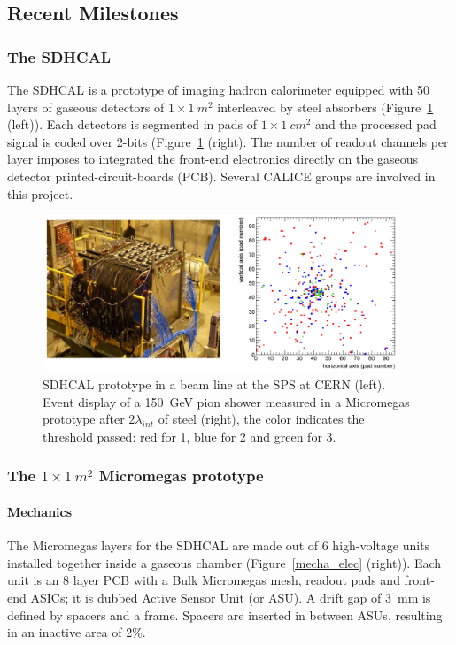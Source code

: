 \subsection{Recent Milestones}

\subsubsection{The SDHCAL}

The SDHCAL is a prototype of imaging hadron calorimeter equipped with 50 layers of gaseous detectors of $1\times \SI{1}{m^{2}}$ interleaved by steel absorbers (Figure~\ref{sdhcal} (left)). Each detectors is segmented in pads of $1\times\SI{1}{cm^{2}}$ and the processed pad signal is coded over 2-bits (Figure~\ref{sdhcal} (right). The number of readout channels per layer imposes to integrated the front-end electronics directly on the gaseous detector printed-circuit-boards (PCB). Several CALICE groups are involved in this project.

\begin{figure}
\begin{centering}
\includegraphics[width=0.95\textwidth]{Calorimeter/SDHCal/test}
\caption{SDHCAL prototype in a beam line at the SPS at CERN (left). Event display of a \SI{150}{GeV} pion shower measured in a Micromegas prototype after $2 \lambda_{int}$ of steel (right), the color indicates the threshold passed: red for 1, blue for 2 and green for 3.}
\label{sdhcal}
\end{centering}
\end{figure}


\subsubsection{The $1\times\SI{1}{m^{2}}$ Micromegas prototype}

\paragraph{Mechanics}
The Micromegas layers for the SDHCAL are made out of 6 high-voltage units installed together inside a gaseous chamber (Figure~\ref{mecha_elec} (right)). Each unit is an 8 layer PCB with a Bulk Micromegas mesh, readout pads and front-end ASICs; it is dubbed Active Sensor Unit (or ASU). A drift gap of \SI{3}{mm} is defined by spacers and a frame. Spacers are inserted in between ASUs, resulting in an inactive area of 2\%.


